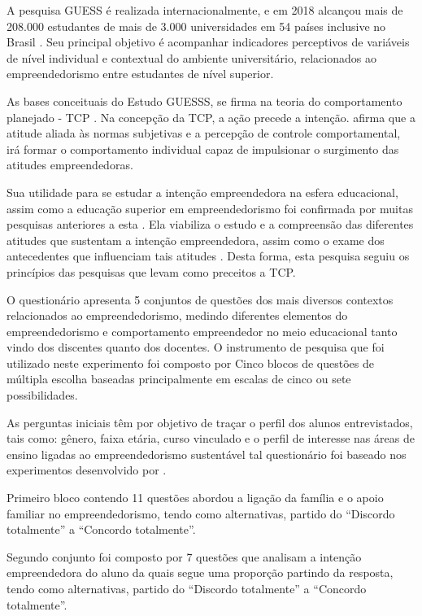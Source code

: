 A pesquisa GUESS é realizada internacionalmente, e em 2018 alcançou mais de 208.000 estudantes de mais de 3.000 universidades em 54 países inclusive no Brasil \cite{sieger_global_2018}.  Seu  principal  objetivo  é  acompanhar  indicadores perceptivos   de   variáveis   de   nível individual   e   contextual   do   ambiente   universitário, relacionados ao empreendedorismo entre estudantes de nível superior.


As bases conceituais do Estudo GUESSS, se firma na teoria do comportamento planejado - TCP \cite{ajzen_perceived_2002}. Na concepção da TCP, a ação precede a intenção.  afirma que a atitude aliada às normas subjetivas e a percepção de controle comportamental, irá formar o comportamento individual capaz de impulsionar o surgimento das atitudes empreendedoras.

Sua utilidade para se estudar a intenção empreendedora na esfera educacional, assim como a  educação superior em empreendedorismo foi confirmada por muitas pesquisas anteriores a esta \cite{krueger_potencial_2018,gonzalez_predictors_2009,fayolle_effect_2006} . Ela viabiliza o estudo e a compreensão das diferentes atitudes que sustentam a intenção empreendedora, assim como o exame dos antecedentes que influenciam tais atitudes \cite{lima_educacao_2014}. Desta forma, esta pesquisa seguiu os princípios das pesquisas que levam como preceitos a TCP.

O questionário apresenta 5 conjuntos de questões dos mais diversos contextos relacionados ao empreendedorismo, medindo diferentes elementos do empreendedorismo e comportamento empreendedor no meio educacional tanto vindo dos discentes quanto dos docentes. O instrumento de pesquisa que foi utilizado neste experimento foi composto por Cinco blocos de questões de múltipla escolha baseadas principalmente em escalas de cinco ou sete possibilidades.

As perguntas iniciais têm por objetivo de traçar o perfil dos alunos entrevistados, tais como: gênero, faixa etária, curso vinculado e o perfil de interesse nas áreas de ensino ligadas ao empreendedorismo sustentável tal questionário foi baseado nos experimentos desenvolvido por . 


Primeiro bloco contendo 11 questões abordou a ligação da família e o apoio familiar no empreendedorismo, tendo como alternativas, partido do “Discordo totalmente” a “Concordo totalmente”.

Segundo conjunto foi composto por 7 questões que analisam a intenção empreendedora do aluno da quais segue uma proporção partindo da resposta, tendo como alternativas, partido do “Discordo totalmente” a “Concordo totalmente”.

